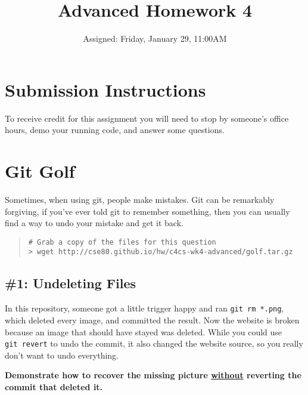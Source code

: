 \documentclass{article}
\begin{document}
\fancyfoot[C]{\color{gray} \thepage~/~\pageref*{LastPage}}
\pagestyle{fancyplain}


\title{\textbf{Advanced Homework 4\\}}
\author{Assigned: Friday, January 29, 11:00AM}
\date{\textbf{\color{red}{Due: Before the first lecture on Friday}}}
\maketitle


\section*{Submission Instructions}
To receive credit for this assignment you will need to stop by someone's
office hours, demo your running code, and answer some questions.


\section{Git Golf}

Sometimes, when using git, people make mistakes. Git can be remarkably
forgiving, if you've ever told git to remember something, then you can usually
find a way to undo your mistake and get it back.

\begin{quote}
\begin{lstlisting}
# Grab a copy of the files for this question
> wget http://cse80.github.io/hw/c4cs-wk4-advanced/golf.tar.gz
\end{lstlisting}
\end{quote}

\subsection*{\#1: Undeleting Files}

In this repository, someone got a little trigger happy and ran
\texttt{git~rm~*.png}, which deleted every image, and committed the result.
Now the website is broken because an image that should have stayed was
deleted. While you could use \texttt{git~revert} to undo the commit, it also
changed the website source, so you really don't want to undo everything.

\noindent
\textbf{Demonstrate how to recover the missing picture \ul{without} reverting
the commit that deleted it.}
\end{document}
